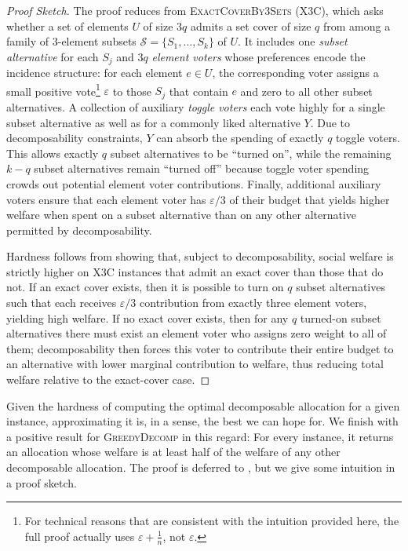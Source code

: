 \documentclass[11pt]{article}
\newcommand{\GrdDec}{\textsc{GreedyDecomp} }
\begin{document}
\begin{proof}[Proof Sketch]
The proof reduces from \textsc{ExactCoverBy3Sets (X3C)}, which asks whether a set of elements $U$ of size $3q$ admits a set cover of size $q$ from among a family of 3-element subsets $\mathcal{S} = \{ S_1, \ldots, S_k \}$ of $U$. 
It includes one \emph{subset alternative} for each $S_j$ and $3q$ \emph{element voters} whose preferences encode the incidence structure: for each element $e \in U$, the corresponding voter assigns a small positive vote\footnote{For technical reasons that are consistent with the intuition provided here, the full proof actually uses $\varepsilon+\frac{1}{n}$, not $\varepsilon$.} $\varepsilon$ to those $S_j$ that contain $e$ and zero to all other subset alternatives. A collection of auxiliary \emph{toggle voters} each vote highly for a single subset alternative as well as for a commonly liked alternative $Y$. Due to decomposability constraints, $Y$ can absorb the spending of exactly $q$ toggle voters. This allows exactly $q$ subset alternatives to be ``turned on'', while the remaining $k-q$ subset alternatives remain ``turned off'' because toggle voter spending crowds out potential element voter contributions. Finally, additional auxiliary voters ensure that each element voter has $\varepsilon/3$ of their budget that yields higher welfare when spent on a subset alternative than on any other alternative permitted by decomposability.

Hardness follows from showing that, subject to decomposability, social welfare is strictly higher on X3C instances that admit an exact cover than those that do not. If an exact cover exists, then it is possible to turn on $q$ subset alternatives such that each receives $\varepsilon/3$ contribution from exactly three element voters, yielding high welfare. If no exact cover exists, then for any $q$ turned-on subset alternatives there must exist an element voter who assigns zero weight to all of them; decomposability then forces this voter to contribute their entire budget to an alternative with lower marginal contribution to welfare, thus reducing total welfare relative to the exact-cover case.
\end{proof}


Given the hardness of computing the optimal decomposable allocation for a given instance, approximating it is, in a sense, the best we can hope for.
We finish with a positive result for \GrdDec in this regard: For every instance, it returns an allocation whose welfare is at least half of the welfare of any other decomposable allocation.
The proof is deferred to , but we give some intuition in a proof sketch.
\end{document}
